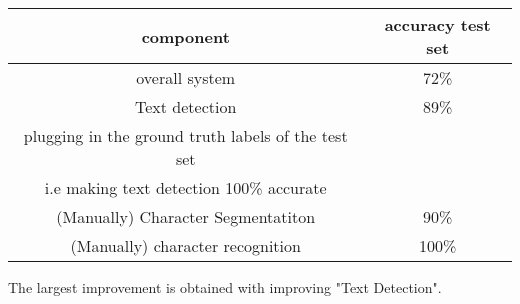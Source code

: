 \documentclass[a4paper,12pt]{report}
\begin{document}
\begin{table}[H]
\begin{tabular}{||c|c||}
\hline
\textbf{component} & \textbf{accuracy test set} \\
\hline
overall system & 72\% \\
\hline
Text detection & 89\% \\
plugging in the ground truth labels of the test set & \\
i.e making text detection 100\% accurate & \\
\hline
(Manually) Character Segmentatiton & 90\% \\
\hline
(Manually) character recognition & 100\% \\
\hline
\end{tabular}
\end{table}
The largest improvement is obtained with improving "Text Detection". 
\end{document}
